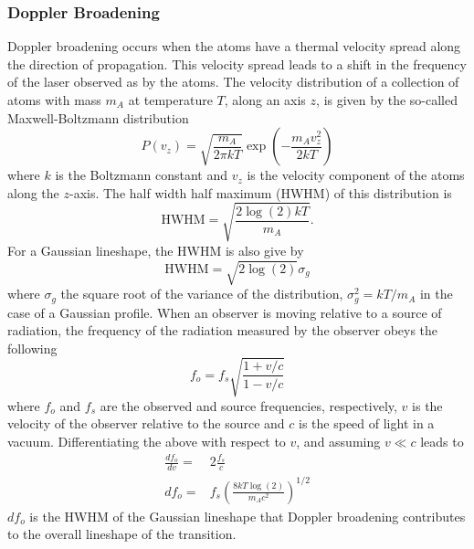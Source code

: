 \subsubsection{Doppler Broadening}
Doppler broadening occurs when the atoms have a thermal velocity spread along the direction of propagation. This velocity spread leads to a shift in the frequency of the laser observed as by the atoms. The velocity distribution of a collection of atoms with mass $m_A$ at temperature $T$, along an axis $z$, is given by the so-called Maxwell-Boltzmann distribution \cite{thermal}
\begin{equation}
P(v_z) = \sqrt{\frac{m_A}{2 \pi kT}}\exp\left(-\frac{m_Av_z^2}{2kT}\right)
\label{MBD}
\end{equation}
\noindent where $k$ is the Boltzmann constant and $v_z$ is the velocity component of the atoms along the $z$-axis. The half width half maximum (HWHM) of this distribution is
\begin{equation}
\mathrm{HWHM} = \sqrt{\frac{2\log{(2)}kT}{m_A}}.
\end{equation}
For a Gaussian lineshape, the HWHM is also give by
\begin{equation}
\mathrm{HWHM} = \sqrt{2\log(2)}\sigma_g
\end{equation}
where $\sigma_g$ the square root of the variance of the distribution, $\sigma_g^2 = kT/m_A$ in the case of a Gaussian profile. When an observer is moving relative to a source of radiation, the frequency of the radiation measured by the observer obeys the following \cite{landau1975}
\begin{equation}
f_o = f_s\sqrt{\frac{1+v/c}{1-v/c}}
\label{dop_shift}
\end{equation}
where $f_o$ and $f_s$ are the observed and source frequencies, respectively, $v$ is the velocity of the observer relative to the source and $c$ is the speed of light in a vacuum. Differentiating the above with respect to $v$, and assuming $v\ll c$ leads to
\begin{align*}
\frac{df_o}{dv} =& 2\frac{f_s}{c}\\ \nonumber
df_o =& f_s\left(\frac{8kT\log(2)}{m_Ac^2}\right)^{1/2}
\end{align*}
\label{temp_width}
$df_o$ is the HWHM of the Gaussian lineshape that Doppler broadening contributes to the overall lineshape of the transition\cite{TomT}.

